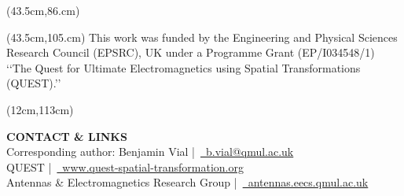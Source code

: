\documentclass[final,12pt]{beamer} %
\begin{document}
\begin{frame}
% 
% 
% 
% 
\begin{textblock*}{38.5cm}(43.5cm,86.cm)
\color{fresnelblack}
\printbibliography
\end{textblock*}

\begin{textblock*}{38.5cm}(43.5cm,105.cm)
\color{fresnelblack}
This work was funded by the Engineering and Physical
Sciences Research Council (EPSRC), UK under a
Programme Grant (EP/I034548/1) ‘‘The Quest for
Ultimate Electromagnetics using Spatial Transformations
(QUEST).’’
\end{textblock*}
% 

\begin{textblock*}{70cm}(12cm,113cm)


{\hfill\semiboldfont \bfseries \color{fresnelorange} \Large CONTACT \& LINKS}\\
\vspace*{0.5em}
\color{white}
\hfill Corresponding author: Benjamin Vial |~\textcolor{fresnelorange}{\href{mailto:b.vial@qmul.ac.uk}{\faEnvelope~b.vial@qmul.ac.uk}}\\
\hfill QUEST |~\textcolor{fresnelorange}{\href{http://www.quest-spatial-transformation.org}{\faExternalLink~www.quest-spatial-transformation.org}}\\
\hfill Antennas \& Electromagnetics Research Group |~\textcolor{fresnelorange}{\href{http://antennas.eecs.qmul.ac.uk}{\faExternalLink~antennas.eecs.qmul.ac.uk}}


\end{textblock*}
\end{frame}
\end{document}

